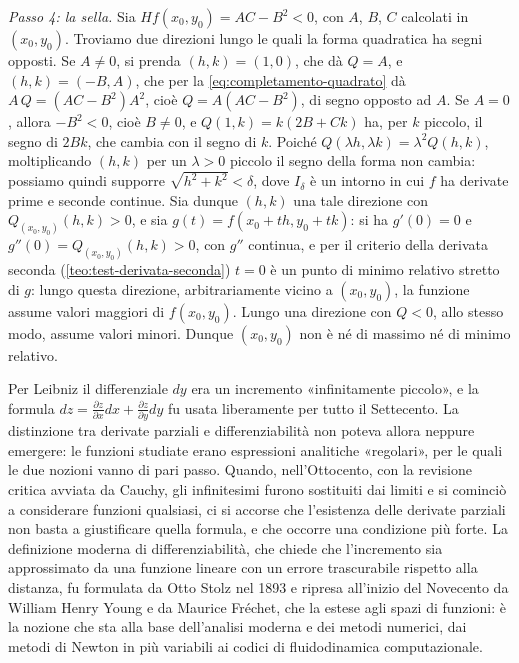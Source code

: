 \begin{dimostrazione}
\emph{Passo 4: la sella.} Sia $Hf(x_{0},y_{0})=AC-B^{2}<0$, con $A$, $B$, $C$ calcolati in
$(x_{0},y_{0})$. Troviamo due direzioni lungo le quali la forma quadratica ha segni
opposti. Se $A\neq0$, si prenda $(h,k)=(1,0)$, che dà $Q=A$, e $(h,k)=(-B,A)$, che per la
\eqref{eq:completamento-quadrato} dà $A\,Q=(AC-B^{2})A^{2}$, cioè $Q=A(AC-B^{2})$, di segno
opposto ad $A$. Se $A=0$, allora $-B^{2}<0$, cioè $B\neq0$, e $Q(1,k)=k(2B+Ck)$ ha, per $k$
piccolo, il segno di $2Bk$, che cambia con il segno di $k$. Poiché
$Q(\lambda h,\lambda k)=\lambda^{2}Q(h,k)$, moltiplicando $(h,k)$ per un $\lambda>0$ piccolo il
segno della forma non cambia: possiamo quindi supporre $\sqrt{h^{2}+k^{2}}<\delta$, dove
$I_{\delta}$ è un intorno in cui $f$ ha derivate prime e seconde continue. Sia dunque $(h,k)$
una tale direzione con $Q_{(x_{0},y_{0})}(h,k)>0$, e sia $g(t)=f(x_{0}+th,y_{0}+tk)$: si ha $g'(0)=0$ e
$g''(0)=Q_{(x_{0},y_{0})}(h,k)>0$, con $g''$ continua, e per il criterio della derivata
seconda (\cref{teo:test-derivata-seconda}) $t=0$ è un punto di minimo relativo stretto
di $g$: lungo questa direzione, arbitrariamente vicino a $(x_{0},y_{0})$, la funzione assume
valori maggiori di $f(x_{0},y_{0})$. Lungo una direzione con $Q<0$, allo stesso modo,
assume valori minori. Dunque $(x_{0},y_{0})$ non è né di massimo né di minimo relativo.
\end{dimostrazione}

\begin{notastorica}
Per Leibniz il differenziale $dy$ era un incremento «infinitamente piccolo», e la formula
$dz=\frac{\partial z}{\partial x}dx+\frac{\partial z}{\partial y}dy$ fu usata liberamente per
tutto il Settecento. La distinzione tra derivate parziali e differenziabilità non poteva
allora neppure emergere: le funzioni studiate erano espressioni analitiche «regolari», per
le quali le due nozioni vanno di pari passo. Quando, nell'Ottocento, con la revisione
critica avviata da Cauchy, gli infinitesimi furono sostituiti dai limiti e si cominciò a
considerare funzioni qualsiasi, ci si accorse che l'esistenza delle derivate parziali non
basta a giustificare quella formula, e che occorre una condizione più forte. La definizione moderna di
differenziabilità, che chiede che l'incremento sia approssimato da una funzione lineare
con un errore trascurabile rispetto alla distanza, fu formulata da Otto Stolz nel 1893 e
ripresa all'inizio del Novecento da William Henry Young e da Maurice Fréchet, che la
estese agli spazi di funzioni: è la nozione che sta alla base dell'analisi moderna e dei
metodi numerici, dai metodi di Newton in più variabili ai codici di fluidodinamica
computazionale.
\end{notastorica}

